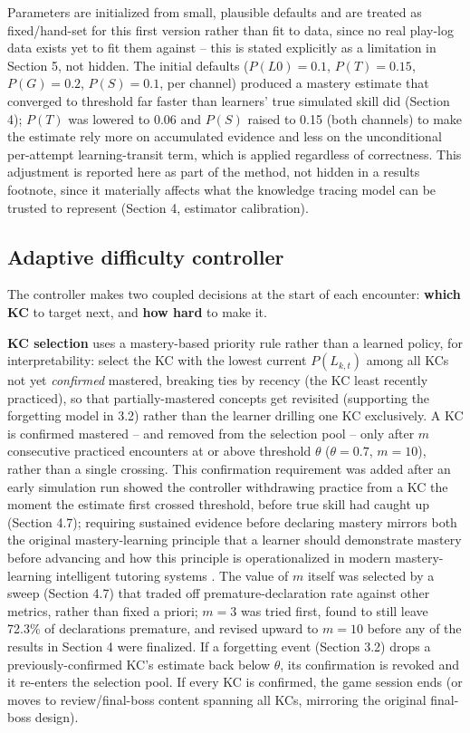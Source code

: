 \documentclass[11pt]{article}
\begin{document}
Parameters are initialized from small, plausible defaults and are treated as fixed/hand-set for this first version rather than fit to data, since no real play-log data exists yet to fit them against -- this is stated explicitly as a limitation in Section 5, not hidden. The initial defaults ($P(L0){=}0.1$, $P(T){=}0.15$, $P(G){=}0.2$, $P(S){=}0.1$, per channel) produced a mastery estimate that converged to threshold far faster than learners' true simulated skill did (Section 4); $P(T)$ was lowered to 0.06 and $P(S)$ raised to 0.15 (both channels) to make the estimate rely more on accumulated evidence and less on the unconditional per-attempt learning-transit term, which is applied regardless of correctness. This adjustment is reported here as part of the method, not hidden in a results footnote, since it materially affects what the knowledge tracing model can be trusted to represent (Section 4, estimator calibration).

\subsection{Adaptive difficulty controller}

The controller makes two coupled decisions at the start of each encounter: \textbf{which KC} to target next, and \textbf{how hard} to make it.

\textbf{KC selection} uses a mastery-based priority rule rather than a learned policy, for interpretability: select the KC with the lowest current $P(L_{k,t})$ among all KCs not yet \textit{confirmed} mastered, breaking ties by recency (the KC least recently practiced), so that partially-mastered concepts get revisited (supporting the forgetting model in 3.2) rather than the learner drilling one KC exclusively. A KC is confirmed mastered -- and removed from the selection pool -- only after $m$ consecutive practiced encounters at or above threshold $\theta$ ($\theta{=}0.7$, $m{=}10$), rather than a single crossing. This confirmation requirement was added after an early simulation run showed the controller withdrawing practice from a KC the moment the estimate first crossed threshold, before true skill had caught up (Section 4.7); requiring sustained evidence before declaring mastery mirrors both the original mastery-learning principle that a learner should demonstrate mastery before advancing \cite{ref38} and how this principle is operationalized in modern mastery-learning intelligent tutoring systems \cite{ref17}. The value of $m$ itself was selected by a sweep (Section 4.7) that traded off premature-declaration rate against other metrics, rather than fixed a priori; $m{=}3$ was tried first, found to still leave 72.3\% of declarations premature, and revised upward to $m{=}10$ before any of the results in Section 4 were finalized. If a forgetting event (Section 3.2) drops a previously-confirmed KC's estimate back below $\theta$, its confirmation is revoked and it re-enters the selection pool. If every KC is confirmed, the game session ends (or moves to review/final-boss content spanning all KCs, mirroring the original final-boss design).
\end{document}
